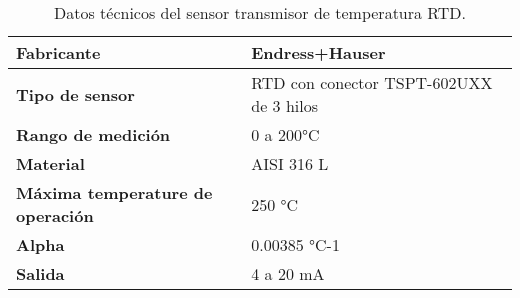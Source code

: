 \renewcommand{\arraystretch}{2}
\begin{table}[H]
    \centering
    \caption{Datos técnicos del sensor transmisor de temperatura RTD.}
    \label{table:sensor_temperatura}
    \begin{tabular}{| L{5cm} | L{5cm} |}
        \hline
        \textbf{Fabricante} & Endress+Hauser  \\
        \hline
        \textbf{Tipo de sensor} & RTD con conector TSPT-602UXX de 3 hilos  \\
        \hline
        \textbf{Rango de medición} & 0 a 200°C  \\
        \hline
        \textbf{Material} & AISI 316 L  \\
        \hline
        \textbf{Máxima temperature de operación} & 250 °C  \\
        \hline
        \textbf{Alpha} & 0.00385 °C-1  \\
        \hline
        \textbf{Salida} & 4 a 20 mA  \\
        \hline
   
    \end{tabular}
\end{table}

